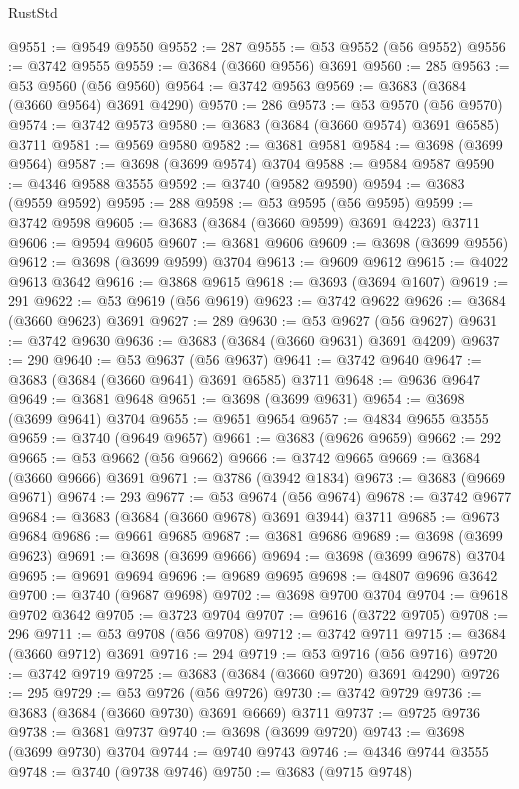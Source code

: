 \begin{lexlean}{RustStd}
\begin{coremodule}
@9551 := @9549 @9550
@9552 := 287
@9555 := @53 @9552 (@56 @9552)
@9556 := @3742 @9555
@9559 := @3684 (@3660 @9556) @3691
@9560 := 285
@9563 := @53 @9560 (@56 @9560)
@9564 := @3742 @9563
@9569 := @3683 (@3684 (@3660 @9564) @3691 @4290)
@9570 := 286
@9573 := @53 @9570 (@56 @9570)
@9574 := @3742 @9573
@9580 := @3683 (@3684 (@3660 @9574) @3691 @6585) @3711
@9581 := @9569 @9580
@9582 := @3681 @9581
@9584 := @3698 (@3699 @9564)
@9587 := @3698 (@3699 @9574) @3704
@9588 := @9584 @9587
@9590 := @4346 @9588 @3555
@9592 := @3740 (@9582 @9590)
@9594 := @3683 (@9559 @9592)
@9595 := 288
@9598 := @53 @9595 (@56 @9595)
@9599 := @3742 @9598
@9605 := @3683 (@3684 (@3660 @9599) @3691 @4223) @3711
@9606 := @9594 @9605
@9607 := @3681 @9606
@9609 := @3698 (@3699 @9556)
@9612 := @3698 (@3699 @9599) @3704
@9613 := @9609 @9612
@9615 := @4022 @9613 @3642
@9616 := @3868 @9615
@9618 := @3693 (@3694 @1607)
@9619 := 291
@9622 := @53 @9619 (@56 @9619)
@9623 := @3742 @9622
@9626 := @3684 (@3660 @9623) @3691
@9627 := 289
@9630 := @53 @9627 (@56 @9627)
@9631 := @3742 @9630
@9636 := @3683 (@3684 (@3660 @9631) @3691 @4209)
@9637 := 290
@9640 := @53 @9637 (@56 @9637)
@9641 := @3742 @9640
@9647 := @3683 (@3684 (@3660 @9641) @3691 @6585) @3711
@9648 := @9636 @9647
@9649 := @3681 @9648
@9651 := @3698 (@3699 @9631)
@9654 := @3698 (@3699 @9641) @3704
@9655 := @9651 @9654
@9657 := @4834 @9655 @3555
@9659 := @3740 (@9649 @9657)
@9661 := @3683 (@9626 @9659)
@9662 := 292
@9665 := @53 @9662 (@56 @9662)
@9666 := @3742 @9665
@9669 := @3684 (@3660 @9666) @3691
@9671 := @3786 (@3942 @1834)
@9673 := @3683 (@9669 @9671)
@9674 := 293
@9677 := @53 @9674 (@56 @9674)
@9678 := @3742 @9677
@9684 := @3683 (@3684 (@3660 @9678) @3691 @3944) @3711
@9685 := @9673 @9684
@9686 := @9661 @9685
@9687 := @3681 @9686
@9689 := @3698 (@3699 @9623)
@9691 := @3698 (@3699 @9666)
@9694 := @3698 (@3699 @9678) @3704
@9695 := @9691 @9694
@9696 := @9689 @9695
@9698 := @4807 @9696 @3642
@9700 := @3740 (@9687 @9698)
@9702 := @3698 @9700 @3704
@9704 := @9618 @9702 @3642
@9705 := @3723 @9704
@9707 := @9616 (@3722 @9705)
@9708 := 296
@9711 := @53 @9708 (@56 @9708)
@9712 := @3742 @9711
@9715 := @3684 (@3660 @9712) @3691
@9716 := 294
@9719 := @53 @9716 (@56 @9716)
@9720 := @3742 @9719
@9725 := @3683 (@3684 (@3660 @9720) @3691 @4290)
@9726 := 295
@9729 := @53 @9726 (@56 @9726)
@9730 := @3742 @9729
@9736 := @3683 (@3684 (@3660 @9730) @3691 @6669) @3711
@9737 := @9725 @9736
@9738 := @3681 @9737
@9740 := @3698 (@3699 @9720)
@9743 := @3698 (@3699 @9730) @3704
@9744 := @9740 @9743
@9746 := @4346 @9744 @3555
@9748 := @3740 (@9738 @9746)
@9750 := @3683 (@9715 @9748)

\end{coremodule}
\end{lexlean}
